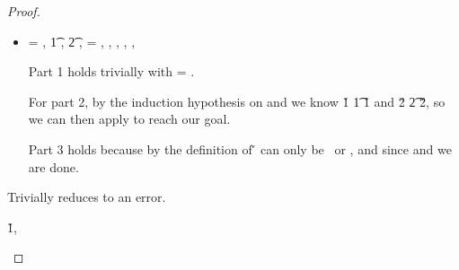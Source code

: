 \begin{lemma}
\begin{proof}
\begin{case}[B-IsA]
  \begin{itemize}
    \item[]
      \begin{subcase}[T-IsA]
  \ep{} = { {}},
  \judgementrewrite {\propenv{}} {} {\t{1}}
             {
                         {}}
                       {}
                       {},
  \judgementrewrite {\propenv{}} {} {\t{2}}
             {
                         {}}
                       {}
                       {},
  \e{} = { {}},
  \issubtypein{}{\Boolean}{\t{}},
  ,
  \inpropenv{\thenprop {\propp{}}}{\thenprop {\prop{}}},
  \inpropenv{\elseprop {\propp{}}}{\elseprop {\prop{}}},
  \issubobjin{}{\emptyobject{}}{\object{}}

        Part 1 holds trivially with \object{} = \emptyobject{}.

        For part 2, by the induction hypothesis on  and 
        we know
  \judgementrewrite {\propenv{}} {\v{1}} {\t{1}}
             {
                         {}}
                       {}
                       {\v{1}} and
  \judgementrewrite {\propenv{}} {\v{2}} {\t{2}}
             {
                         {}}
                       {}
                       {\v{2}},
                       so we can then apply
        to reach our goal.

        Part 3 holds because by the definition of \isaopsemliteral
        \v{} can only be \true\ or \false, 
        and since \judgementtwo{\propenv{}}{\true}{\t{}}
        and
        \judgementtwo{\propenv{}}{\false}{\t{}}
        we are done.
      \end{subcase}
  \end{itemize}
\end{case}

      \begin{case}[BE-IsA1]
        \opsem {\openv{}} {} {\errorvalv{}}

        Trivially reduces to an error.
      \end{case}
      \begin{case}[BE-IsA2]
       \opsem {\openv{}} {} {\v{1}},
       \opsem {\openv{}} {} {\errorvalv{}}


\end{case}
\end{proof}
\end{lemma}

